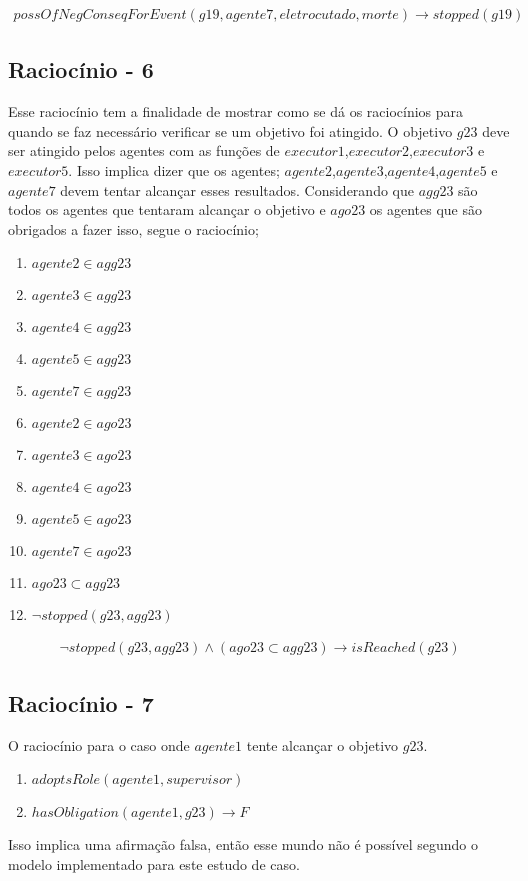 \begin{eqnarray}
	possOfNegConseqForEvent(g19,agente7,eletrocutado,morte) \to stopped(g19)
\end{eqnarray}


\subsection{Raciocínio - 6}
\label{raciocinio6}
Esse raciocínio tem a finalidade de mostrar como se dá os raciocínios para quando se faz necessário verificar se um objetivo foi atingido. O objetivo $g23$ deve ser atingido pelos agentes com as funções de $executor1$,$executor2$,$executor3$ e $executor5$. Isso implica dizer que os agentes; $agente2$,$agente3$,$agente4$,$agente5$ e $agente7$ devem tentar alcançar esses resultados. Considerando que $agg23$ são todos os agentes que tentaram alcançar o objetivo e $ago23$ os agentes que são obrigados a fazer isso, segue o raciocínio;


\begin{enumerate}
	\item $agente2 \in agg23$	
	\item $agente3 \in agg23$
	\item $agente4 \in agg23$
	\item $agente5 \in agg23$
	\item $agente7 \in agg23$								
	\item $agente2 \in ago23$	
	\item $agente3 \in ago23$
	\item $agente4 \in ago23$
	\item $agente5 \in ago23$
	\item $agente7 \in ago23$	
	\item $ago23 \subset agg23$
	\item $\neg stopped(g23,agg23)$										
\end{enumerate}

\begin{eqnarray}\label{rel15}
	\neg stopped(g23,agg23) \wedge (ago23 \subset agg23) \to isReached(g23)
\end{eqnarray}

\subsection{Raciocínio - 7}
\label{raciocinio7}
O raciocínio para o caso onde $agente1$ tente alcançar o objetivo $g23$.  

\begin{enumerate}
	\item $adoptsRole(agente1,supervisor)$
	\item $hasObligation(agente1,g23) \to F$										
\end{enumerate}

Isso implica uma afirmação falsa, então esse mundo não é possível segundo o modelo implementado para este estudo de caso.